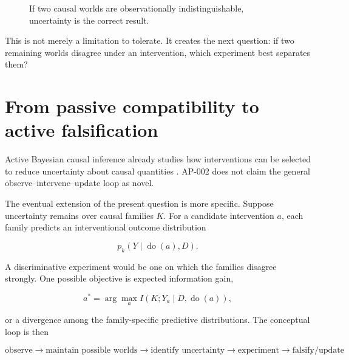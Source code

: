 \documentclass[11pt]{article}
\newcommand{\doop}{\operatorname{do}}
\begin{document}
\begin{figure}[h]
\centering
{}
\caption{If two causal worlds are observationally indistinguishable, uncertainty is the correct result.}
\end{figure}

This is not merely a limitation to tolerate. It creates the next question: if two remaining worlds disagree under an intervention, which experiment best separates them?

\section{From passive compatibility to active falsification}

Active Bayesian causal inference already studies how interventions can be selected to reduce uncertainty about causal quantities \cite{toth2022}. AP-002 does not claim the general observe--intervene--update loop as novel.

The eventual extension of the present question is more specific. Suppose uncertainty remains over causal families $K$. For a candidate intervention $a$, each family predicts an interventional outcome distribution

\begin{equation}
p_k(Y\mid\doop(a),D).
\end{equation}

A discriminative experiment would be one on which the families disagree strongly. One possible objective is expected information gain,

\begin{equation}
a^*=\arg\max_a I\!\left(K;Y_a\mid D,\doop(a)\right),
\end{equation}

or a divergence among the family-specific predictive distributions. The conceptual loop is then

\begin{equation}
\boxed{
\text{observe}\rightarrow
\text{maintain possible worlds}\rightarrow
\text{identify uncertainty}\rightarrow
\text{experiment}\rightarrow
\text{falsify/update}
}.
\end{equation}
\end{document}

